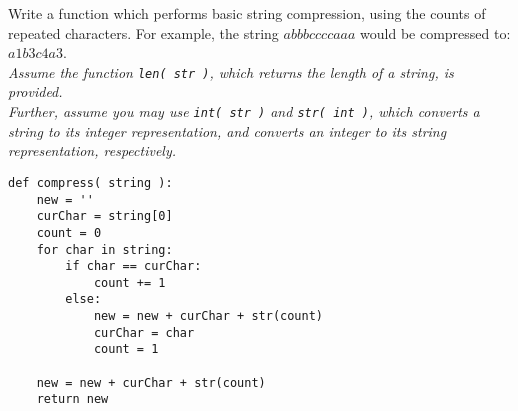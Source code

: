 Write a function which performs basic string compression, using the counts of repeated characters. For example, 
the string $abbbccccaaa$ would be compressed to: $a1b3c4a3$. \\
 \emph{Assume the function \texttt{len( str )}, which returns the length of a string, is provided. \\
      Further, assume you may use \texttt{int( str )} and \texttt{str( int )}, which converts a string to its integer representation, and converts an integer to its string representation, respectively.}

\begin{answer}
\begin{lstlisting}
def compress( string ):
    new = ''
    curChar = string[0]
    count = 0
    for char in string:
        if char == curChar:
            count += 1
        else:
            new = new + curChar + str(count)
            curChar = char
            count = 1 

    new = new + curChar + str(count)
    return new
\end{lstlisting}
\end{answer}
